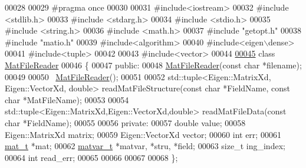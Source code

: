 \begin{DoxyCode}
00028 
00029 \textcolor{preprocessor}{#pragma once}
00030 
00031 \textcolor{preprocessor}{#include<iostream>}
00032 \textcolor{preprocessor}{#include <stdlib.h>}
00033 \textcolor{preprocessor}{#include <stdarg.h>}
00034 \textcolor{preprocessor}{#include <stdio.h>}
00035 \textcolor{preprocessor}{#include <string.h>}
00036 \textcolor{preprocessor}{#include <math.h>}
00037 \textcolor{preprocessor}{#include "getopt.h"}
00038 \textcolor{preprocessor}{#include "matio.h"}
00039 \textcolor{preprocessor}{#include<algorithm>}
00040 \textcolor{preprocessor}{#include<eigen\(\backslash\)dense>}
00041 \textcolor{preprocessor}{#include<tuple>}
00042 
00043 \textcolor{preprocessor}{#include<vector>}
00044 
\hyperlink{class_mat_file_reader}{00045} \textcolor{keyword}{class }\hyperlink{class_mat_file_reader}{MatFileReader}
00046 \{
00047 \textcolor{keyword}{public}:
00048     \hyperlink{class_mat_file_reader}{MatFileReader}(\textcolor{keyword}{const} \textcolor{keywordtype}{char} *filename);
00049 
00050     ~\hyperlink{class_mat_file_reader}{MatFileReader}();
00051 
00052     std::tuple<Eigen::MatrixXd, Eigen::VectorXd, double> readMatFileStructure(\textcolor{keyword}{const} \textcolor{keywordtype}{char} *FieldName, \textcolor{keyword}{const} \textcolor{keywordtype}{
      char} *MatFileName);
00053 
00054     std::tuple<Eigen::MatrixXd,Eigen::VectorXd,double> readMatFileData(\textcolor{keyword}{const} \textcolor{keywordtype}{char} *FieldName);
00055 
00056 \textcolor{keyword}{private}:
00057     \textcolor{keywordtype}{double} value;
00058     Eigen::MatrixXd matrix;
00059     Eigen::VectorXd vector;
00060     \textcolor{keywordtype}{int}   err;
00061     \hyperlink{struct__mat__t}{mat\_t}    *mat;
00062     \hyperlink{group___m_a_t_structmatvar__t}{matvar\_t} *matvar, *stru, *field;
00063     \textcolor{keywordtype}{size\_t} ing\_index;
00064     \textcolor{keywordtype}{int} read\_err;
00065 
00066 
00067 
00068 \};
\end{DoxyCode}
